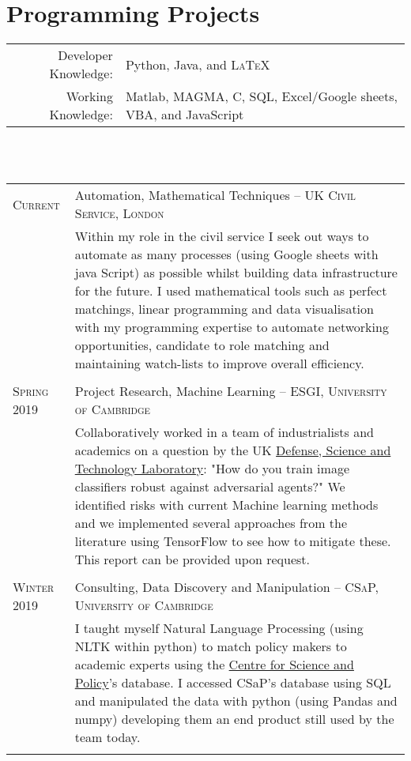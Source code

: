 \documentclass[a4paper,10pt]{article}
\begin{document}
\section{Programming Projects}
\begin{tabular}{rl}
	Developer Knowledge: &  Python, Java, and \textsc{LaTeX}\\
	Working Knowledge: & Matlab, \textsc{MAGMA}, C, SQL, Excel/Google sheets, VBA, and JavaScript\\
\end{tabular}\\
\vspace{0.1 in}\\
\begin{tabular}{p{2.25cm}|p{15cm}}
	\textsc{Current}  & Automation, Mathematical Techniques -- \textsc{UK Civil Service, London} \\&\footnotesize{Within my role in the civil service I seek out ways to automate as many processes (using Google sheets with java Script) as possible whilst building data infrastructure for the future. I used mathematical tools such as perfect matchings, linear programming and data visualisation with my programming expertise to automate networking opportunities, candidate to role matching and maintaining watch-lists to improve overall efficiency.}\\\multicolumn{2}{c}{} \\
	\textsc{Spring 2019} & Project Research, Machine Learning -- \textsc{ESGI, University of Cambridge} \\&\footnotesize{Collaboratively worked in a team of industrialists and academics on a question by the UK \href{https://www.gov.uk/government/organisations/defence-science-and-technology-laboratory}{Defense, Science and Technology Laboratory}: "How do you train image classifiers robust against adversarial agents?" We identified risks with current Machine learning methods and we implemented several approaches from the literature using TensorFlow to see how to mitigate these. This report can be provided upon request.}\\\multicolumn{2}{c}{} \\
	\textsc{Winter 2019} & Consulting, Data Discovery and Manipulation -- \textsc{CSaP, University of Cambridge}\\&\footnotesize{I taught myself Natural Language Processing (using NLTK within python) to match policy makers to academic experts using the \href{https://www.csap.cam.ac.uk/}{Centre for Science and Policy}'s database. I accessed CSaP's database using SQL and manipulated the data with python (using Pandas and numpy) developing them an end product still used by the team today.}\\\multicolumn{2}{c}{} \\

\end{tabular}
\end{document}
